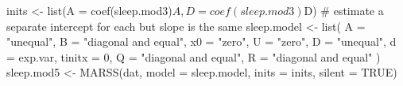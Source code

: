 \begin{Schunk}
\begin{Sinput}
 inits <- list(A = coef(sleep.mod3)$A, D = coef(sleep.mod3)$D)
 # estimate a separate intercept for each but slope is the same
 sleep.model <- list(
   A = "unequal", B = "diagonal and equal", x0 = "zero", U = "zero",
   D = "unequal", d = exp.var, tinitx = 0, Q = "diagonal and equal",
   R = "diagonal and equal"
 )
 sleep.mod5 <- MARSS(dat, model = sleep.model, inits = inits, silent = TRUE)
\end{Sinput}
\end{Schunk}

